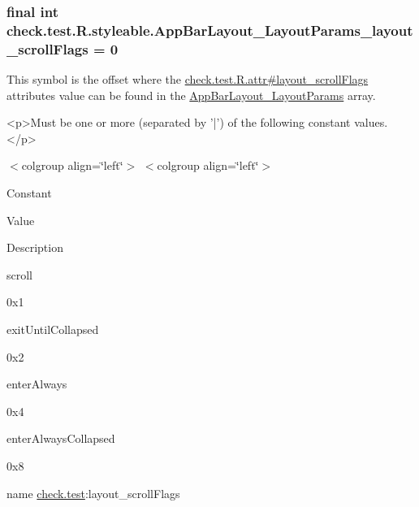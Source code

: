 \subsubsection[{App\+Bar\+Layout\+\_\+\+Layout\+Params\+\_\+layout\+\_\+scroll\+Flags}]{\setlength{\rightskip}{0pt plus 5cm}final int check.\+test.\+R.\+styleable.\+App\+Bar\+Layout\+\_\+\+Layout\+Params\+\_\+layout\+\_\+scroll\+Flags = 0\hspace{0.3cm}{\ttfamily [static]}}\label{classcheck_1_1test_1_1_r_1_1styleable_a9b9cef87b7b8a51d20c37c2a13fb320a}
This symbol is the offset where the \hyperlink{classcheck_1_1test_1_1_r_1_1attr_a4cd51333f9028ba7b1d600246194d391}{check.\+test.\+R.\+attr\#layout\+\_\+scroll\+Flags} attribute\textquotesingle{}s value can be found in the \hyperlink{classcheck_1_1test_1_1_r_1_1styleable_adbe27e505a2c53030b9f1cc91b81a452}{App\+Bar\+Layout\+\_\+\+Layout\+Params} array.

\begin{DoxyVerb}      <p>Must be one or more (separated by '|') of the following constant values.</p>
\end{DoxyVerb}
 \begin{TabularC}{0}
\hline
\end{TabularC}
$<$colgroup align=\char`\"{}left\char`\"{}$>$ $<$colgroup align=\char`\"{}left\char`\"{}$>$ 

Constant

Value

Description 

{\ttfamily scroll}

0x1

{\ttfamily exit\+Until\+Collapsed}

0x2

{\ttfamily enter\+Always}

0x4

{\ttfamily enter\+Always\+Collapsed}

0x8

name \hyperlink{namespacecheck_1_1test}{check.\+test}\+:layout\+\_\+scroll\+Flags \hypertarget{classcheck_1_1test_1_1_r_1_1styleable_a8466df23f54f293c6b7257f630ad0862}{}
